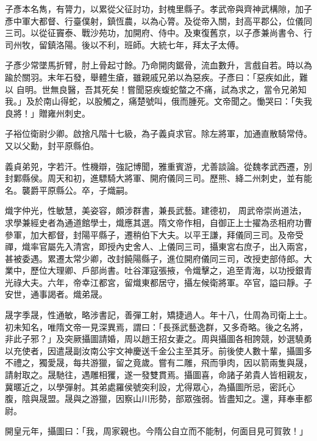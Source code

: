\begin{pinyinscope}
 子彥本名雋，有膂力，以累從父征討功，封槐里縣子。孝武帝與齊神武構隙，加子彥中軍大都督、行臺僕射，鎮恆農，以為心膂。及從帝入關，封高平郡公，位儀同三司。以從征竇泰、戰沙苑功，加開府、侍中。及東復舊京，以子彥兼尚書令、行司州牧，留鎮洛陽。後以不利，班師。大統七年，拜太子太傅。



 子彥少常墜馬折臂，肘上骨起寸餘。乃命開肉鋸骨，流血數升，言戲自若。時以為踰於關羽。末年石發，舉體生瘡，雖親戚兄弟以為惡疾。子彥曰：「惡疾如此，難以
 自明。世無良醫，吾其死矣！嘗聞惡疾蝮蛇螫之不痛，試為求之，當令兄弟知我。」及於南山得蛇，以股觸之，痛楚號叫，俄而腫死。文帝聞之。慟哭曰：「失我良將！」贈雍州刺史。



 子裕位衛尉少卿。啟捨凡階十七級，為子義貞求官。除左將軍，加通直散騎常侍。又以父勳，封平原縣伯。



 義貞弟兕，字若汗。性機辯，強記博聞，雅重賓游，尤善談論。從魏孝武西遷，別封鄴縣侯。周天和初，進驃騎大將軍、開府儀同三司。歷熊、絳二州刺史，並有能名。襲爵平原縣公。卒，子熾嗣。



 熾字仲光，性敏慧，美姿容，頗涉群書，兼長武藝。建德初，
 周武帝崇尚道法，求學兼經史者為通道館學士，熾應其選。隋文帝作相，自御正上士擢為丞相府功曹參軍，加大都督，封陽平縣子，遷稍伯下大夫。以平王謙，拜儀同三司。及帝受禪，熾率官屬先入清宮，即授內史舍人、上儀同三司，攝東宮右庶子，出入兩宮，甚被委遇。累遷太常少卿，改封饒陽縣子，進位開府儀同三司，改授吏部侍郎。大業中，歷位大理卿、戶部尚書。吐谷渾寇張掖，令熾擊之，追至青海，以功授銀青光祿大夫。六年，帝幸江都宮，留熾東都居守，攝左候衛將軍。卒官，謚曰靜。子安世，通事謁者。熾弟晟。



 晟字季晟，性通敏，略涉書記，善彈工射，矯捷過人。年十八，仕周為司衛上士。初未知名，唯隋文帝一見深異焉，謂曰：「長孫武藝逸群，又多奇略。後之名將，非此子邪？」及突厥攝圖請婚，周以趙王招女妻之。周與攝圖各相誇競，妙選驍勇以充使者，因遣晟副汝南公宇文神慶送千金公主至其牙。前後使人數十輩，攝圖多不禮之，獨愛晟，每共游獵，留之竟歲。嘗有二雕，飛而爭肉，因以箭兩隻與晟，請射取之。晟馳往，遇雕相玃，遂一發雙貫焉。攝圖喜，命諸子弟貴人皆相親友，冀暱近之，以學彈射。其弟處羅侯號突利設，尤得眾心，為攝圖所忌，密託心
 腹，陰與晟盟。晟與之游獵，因察山川形勢，部眾強弱。皆盡知之。還，拜奉車都尉。



 開皇元年，攝圖曰：「我，周家親也。今隋公自立而不能制，何面目見可賀敦！」




\end{pinyinscope}
